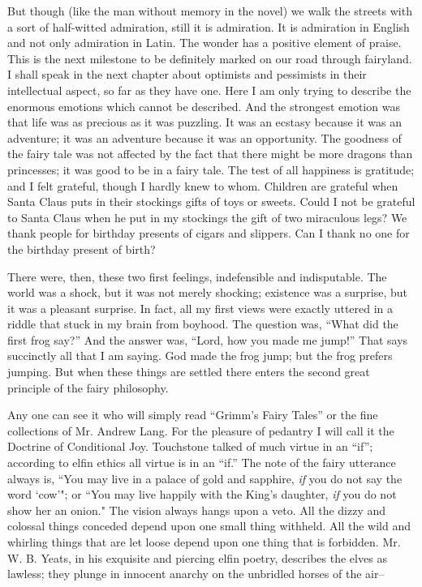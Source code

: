 \documentclass{book}
\begin{document}
But though (like the man without memory in the novel) we walk the streets with a sort of half-witted admiration, still it is admiration. It is admiration in English and not only admiration in Latin. The wonder has a positive element of praise. This is the next milestone to be definitely marked on our road through fairyland. I shall speak in the next chapter about optimists and pessimists in their intellectual aspect, so far as they have one. Here I am only trying to describe the enormous emotions which cannot be described. And the strongest emotion was that life was as precious as it was puzzling. It was an ecstasy because it was an adventure; it was an adventure because it was an opportunity. The goodness of the fairy tale was not affected by the fact that there might be more dragons than princesses; it was good to be in a fairy tale. The test of all happiness is gratitude; and I felt grateful, though I hardly knew to whom. Children are grateful when Santa Claus puts in their stockings gifts of toys or sweets. Could I not be grateful to Santa Claus when he put in my stockings the gift of two miraculous legs? We thank people for birthday presents of cigars and slippers. Can I thank no one for the birthday present of birth?

There were, then, these two first feelings, indefensible and indisputable. The world was a shock, but it was not merely shocking; existence was a surprise, but it was a pleasant surprise. In fact, all my first views were exactly uttered in a riddle that stuck in my brain from boyhood. The question was, “What did the first frog say?” And the answer was, “Lord, how you made me jump!” That says succinctly all that I am saying. God made the frog jump; but the frog prefers jumping. But when these things are settled there enters the second great principle of the fairy philosophy.

Any one can see it who will simply read “Grimm’s Fairy Tales” or the fine collections of Mr. Andrew Lang. For the pleasure of pedantry I will call it the Doctrine of Conditional Joy. Touchstone talked of much virtue in an “if”; according to elfin ethics all virtue is in an “if.” The note of the fairy utterance always is, “You may live in a palace of gold and sapphire, \emph{if} you do not say the word ‘cow’"; or “You may live happily with the King’s daughter, \emph{if} you do not show her an onion." The vision always hangs upon a veto. All the dizzy and colossal things conceded depend upon one small thing withheld. All the wild and whirling things that are let loose depend upon one thing that is forbidden. Mr. W. B. Yeats, in his exquisite and piercing elfin poetry, describes the elves as lawless; they plunge in innocent anarchy on the unbridled horses of the air–
\end{document}
